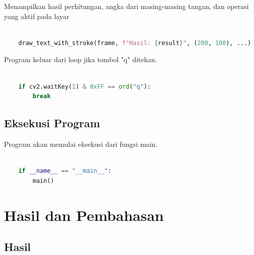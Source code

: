 \documentclass[11pt,a4paper]{article}
\begin{document}
    Menampilkan hasil perhitungan, angka dari masing-masing tangan, dan operasi yang aktif pada layar
    \begin{lstlisting}[language=Python, caption==Output Hasil Perhitungan,]
    
    draw_text_with_stroke(frame, f"Hasil: {result}", (200, 100), ...)
    \end{lstlisting}

    Program keluar dari loop jika tombol "q" ditekan.
    \begin{lstlisting}[language=Python, caption=Escape Program]
    
    if cv2.waitKey(1) & 0xFF == ord("q"):
        break
    \end{lstlisting}
    \subsection{Eksekusi Program}
    Program akan memulai eksekusi dari fungsi main.
    \begin{lstlisting}[language=Python, caption=Eksekusi Program]
    
    if __name__ == "__main__":
        main()
    \end{lstlisting}

\newpage
\section{Hasil dan Pembahasan}
    \subsection{Hasil}
\end{document}
